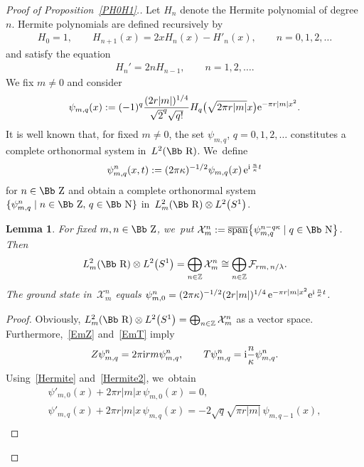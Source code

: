 \documentclass[pdftex]{sigma}
\newcommand\RR{{\mbox{\Bb R}}}
\newcommand\NN{{\mbox{\Bb N}}}
\newcommand\ZZ{{\mbox{\Bb Z}}}
\newcommand\Z{{\mathbb Z}}
\newcommand\cF{{\mathcal F}}
\newcommand{\cSpan}{{\overline{\rm span}}}
\numberwithin{equation}{section}
\newtheorem{Lemma}[Theorem]{Lemma}
\begin{document}
\begin{proof}[Proof of Proposition~\ref{PH0H1}.]
Let $H_n$ denote the Hermite polynomial of degree $n$. Hermite polynomials are defined recursively by
\begin{gather}\label{Hermite}
H_0=1,\qquad H_{n+1}(x)=2xH_n(x)-H'_{n}(x),\qquad n=0,1,2,\dots
\end{gather}
and satisfy the equation
\begin{gather}\label{Hermite2}
H_n'=2nH_{n-1},\qquad n=1,2,\dots.
\end{gather}
We fix $m\not= 0$ and consider
\begin{gather*}
\psi_{m,q}(x):=(-1)^q\frac{(2r|m|)^{1/4}}{\sqrt 2^q\sqrt{q!}}H_q\big(\sqrt{2\pi r|m|}x\big) {\rm e}^{-\pi r|m|x^2}.
\end{gather*}
It is well known that, for fixed $m\not=0$, the set $\psi_{m,q}$, $q=0,1,2,\dots$ constitutes a complete orthonormal system in~$L^2(\RR)$. We~define
\begin{gather*}
\psi_{m,q}^{n}(x,t):=(2\pi\kappa)^{-1/2} \psi_{m,q}(x)\, {\rm e}^{{\rm i}\,\frac{n}{\kappa}t}
\end{gather*}
for $n\in\ZZ$ and obtain a complete orthonormal system $\{\psi_{m,q}^{n}\mid n\in \ZZ,\, q\in\NN\}$ in~$L^2_{m}(\RR)\otimes L^2\big(S^1\big)$.
%
\begin{Lemma}\label{LL2m} For fixed $m,n\in\ZZ$, we~put ${\mathcal X}^{n}_m:=\cSpan\big\{\psi^{n-q\kappa}_{m,q}\mid q\in\NN\big\}$. Then
\begin{gather*}
L^2_m(\RR)\otimes L^2\big(S^1\big)=\bigoplus_{n\in\Z} {\mathcal X}_m^{n}\cong \bigoplus_{n\in\Z} \cF_{rm,\,n/\lambda}.
\end{gather*}
The ground state in~${\mathcal X}_m^{n}$ equals $\psi^n_{m,0}=(2\pi\kappa)^{-1/2}(2r|m|)^{1/4}\, {\rm e}^{-\pi r|m|x^2}{\rm e}^{{\rm i}\,\frac{n}{\kappa}t}$.
\end{Lemma}
\begin{proof}
{\sloppy
Obviously, $L^2_m(\RR)\otimes L^2\big(S^1\big)=\bigoplus_{n\in\Z} {\mathcal X}_m^{n}$ as a vector space. Furthermore,~\eqref{EmZ} and~\eqref{EmT} imply
\begin{gather*}
Z\psi_{m,q}^{n}=2\pi {\rm i}rm\psi_{m,q}^{n},\qquad
T\psi_{m,q}^{n}={\rm i}\frac{n}{\kappa}\psi_{m,q}^{n}. %
\end{gather*}}
Using~\eqref{Hermite} and~\eqref{Hermite2}, we~obtain
\begin{gather*}
\psi'_{m,0}(x)+2\pi r|m|x\,\psi_{m,0}(x)=0, %
\\
\psi'_{m,q}(x)+2\pi r|m|x\,\psi_{m,q}(x)=-2\sqrt{q}\sqrt{\pi r|m|}\,\psi_{m,q-1}(x),%
\\

\end{gather*}
\end{proof}
\end{proof}
\end{document}
